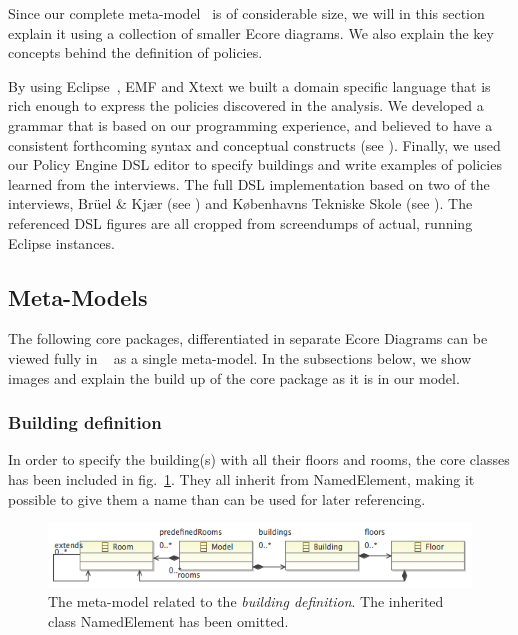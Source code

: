 Since our complete meta-model~\cite{ecore-complete} is of considerable size, we will in this section explain it using a collection of smaller Ecore diagrams. We also explain the key concepts behind the definition of policies.
 
By using Eclipse~\cite{eclipse}, EMF and Xtext we built a domain specific language that is rich enough to express the policies discovered in the analysis. We developed a grammar that is based on our programming experience, and believed to have a consistent forthcoming syntax and conceptual constructs (see ). Finally, we used our Policy Engine DSL editor to specify buildings and write examples of policies learned from the interviews. The full DSL implementation based on two of the interviews,  Br\"{u}el \& Kj\ae r (see ) and  K\o benhavns Tekniske Skole (see ). The referenced DSL figures are all cropped from screendumps of actual, running Eclipse instances.

\subsection{Meta-Models}

The following core packages, differentiated in separate Ecore Diagrams can be viewed fully in ~\cite{ecore-complete} as a single meta-model. In the subsections below, we show images and explain the build up of the core package as it is in our model. 

\subsubsection{Building definition}
In order to specify the building(s) with all their floors and rooms, the core classes has been included in fig. \ref{fig:ecore-building-definition}. They all inherit from NamedElement, making it possible to give them a name than can be used for later referencing.
\begin{figure}[h]
  \centering \includegraphics[scale=.5]{ecore-building-definition.png}  
	\caption{The meta-model related to the \textit{building definition}. The inherited class NamedElement has been omitted.}
	\label{fig:ecore-building-definition}
\end{figure}

